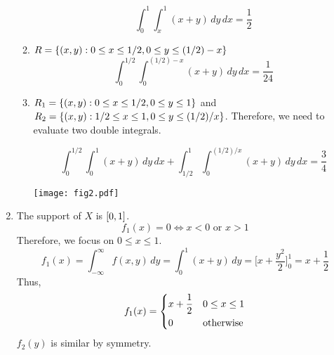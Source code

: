 \begin{Example}{}{}
\begin{enumerate}[label=(\roman*)]
\begin{enumerate}[label=(\alph*)]
\[                            \int_{0}^{1} \int_{x}^{1} (x+y)\, d{y} \, d{x}
                            =\frac{1}{2}
                        \]
                  \item $ R=\{(x,y):0\le x\le
                                1/2,0\le y\le (1/2)-x \} $
                        \[
                            \int_{0}^{1/2} \int_{0}^{(1/2)-x} (x+y)\, d{y} \, d{x}
                            =\frac{1}{24}
                        \]
                  \item $ R_1 = \{(x,y):0\le x\le 1/2,0\le y\le 1\} $ and
                        $ R_2 = \{(x,y):1/2 \le x\le 1, 0\le y\le (1/2)/x\} $.
                        Therefore, we need to evaluate two double integrals.

                        \begin{minipage}{0.6\textwidth}
                            \[ \int_{0}^{1/2} \int_{0}^{1} (x+y)\, d{y} \, d{x}
                                +\int_{1/2}^{1} \int_{0}^{(1/2)/x} (x+y)\, d{y} \, d{x}
                                =\frac{3}{4}
                            \]
                        \end{minipage}
                        \begin{minipage}{0.2\textwidth}
                            \texttt{[image: fig2.pdf]}
                        \end{minipage}
              \end{enumerate}
        \item The support of $ X $ is $ \interval{0}{1} $.
              \[ f_1(x)=0\iff x<0\text{ or } x>1 \]
              Therefore, we focus on $ 0\le x\le 1 $.
              \[ f_1(x)=\int_{-\infty}^{\infty} f(x,y)\, d{y}
                  =\int_{0}^{1} (x+y)\, d{y}=\biggl[ x+\frac{y^2}{2} \biggr]_0^1
                  =x+\frac{1}{2} \]
              Thus,
              \[ f_1(x)=
                  \begin{dcases}
                      x+\frac{1}{2} & 0\le x\le 1      \\
                      0             & \text{otherwise}
                  \end{dcases} \]
              $ f_2(y) $ is similar by symmetry.
    \end{enumerate}
\end{Example}
